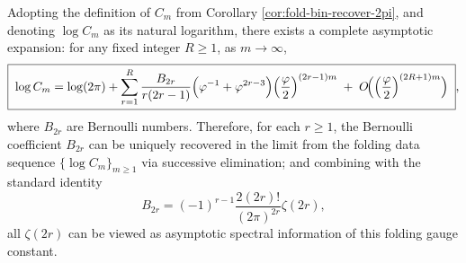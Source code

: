 \begin{theorem}\label{thm:fold-bin-gauge-constant-stirling-bernoulli-hierarchy}
Adopting the definition of \(C_m\) from Corollary \ref{cor:fold-bin-recover-2pi}, and denoting \(\log C_m\) as its natural logarithm,
there exists a complete asymptotic expansion: for any fixed integer \(R\ge 1\), as \(m\to\infty\),
\[
\boxed{\;
\log C_m
=\log(2\pi)+
\sum_{r=1}^{R}
\frac{B_{2r}}{r(2r-1)}
\Bigl(\varphi^{-1}+\varphi^{2r-3}\Bigr)
\Bigl(\frac{\varphi}{2}\Bigr)^{(2r-1)m}
\;+\;
O\!\Bigl(\Bigl(\frac{\varphi}{2}\Bigr)^{(2R+1)m}\Bigr)\; } ,
\]
where \(B_{2r}\) are Bernoulli numbers.
Therefore, for each \(r\ge 1\), the Bernoulli coefficient \(B_{2r}\) can be uniquely recovered in the limit from the folding data sequence \(\{\log C_m\}_{m\ge 1}\) via successive elimination;
and combining with the standard identity
\[
B_{2r}=(-1)^{r-1}\frac{2(2r)!}{(2\pi)^{2r}}\zeta(2r),
\]
all \(\zeta(2r)\) can be viewed as asymptotic spectral information of this folding gauge constant.
\end{theorem}

